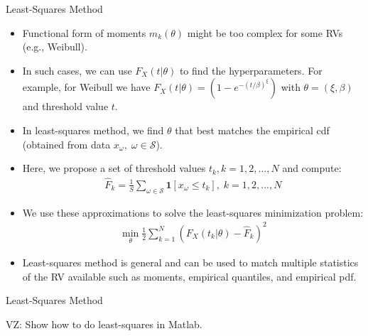 \documentclass[9pt]{beamer}
\begin{document}
%
\begin{frame}{Least-Squares Method}

\begin{itemize}

\item Functional form of moments $m_k(\theta)$ might be too complex for some RVs (e.g., Weibull).

\item In such cases, we can use $F_X(t|\theta)$ to find the hyperparameters. For example, for Weibull we have $F_X(t|\theta)=(1-e^{-(t/\beta)^\xi})$ with $\theta=(\xi,\beta)$ and threshold value $t$. 

\item In least-squares method, we find $\theta$ that best matches the empirical cdf (obtained from data $x_\omega,\; \omega \in \mathcal{S}$). 

\item Here, we propose a set of threshold values $t_k, k=1,2,...,N$ and compute:
\begin{align*}
\hat{F}_k=\frac{1}{S}\sum_{\omega \in \mathcal{S}}\mathbf{1}[x_\omega\leq t_k],\; k=1,2,...,N
\end{align*}

\item  We use these approximations to solve the least-squares minimization problem:
\begin{align*}
\min_\theta \frac{1}{2}\sum_{k=1}^N(F_X(t_k|\theta)-\hat{F}_k)^2
\end{align*}

\item Least-squares method is general and can be used to match multiple statistics of the RV available such as moments, empirical quantiles, and empirical pdf. 

\end{itemize}

\end{frame}


%
\begin{frame}{Least-Squares Method}

\begin{block}{}
{\color{red} VZ: Show how to do least-squares in Matlab.}
\end{block}

\end{frame}
\end{document}
